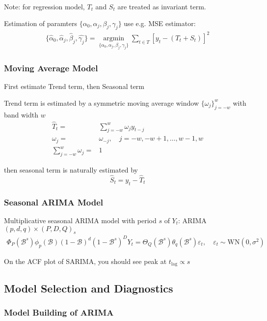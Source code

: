     Note: for regression model, $ T_t $ and $ S_t $ are treated as invariant term.

    Estimation of paramters $ \{\alpha _0,\alpha_j,\beta _j,\gamma _j\} $ use e.g. MSE estimator:
    \begin{align}
        \{\hat{\alpha }_0,\hat{\alpha }_j,\hat{\beta }_j,\hat{\gamma _j}\}=\mathop{\arg\min}\limits_{\{\alpha _0,\alpha_j,\beta _j,\gamma _j\}} \sum_{t\in T} \left[y_t-(T_t+S_t)\right]^2
    \end{align}


\subsubsection{Moving Average Model}
    First estimate Trend term, then Seasonal term

    Trend term is estimated by a symmetric moving average window $ \{\omega _j\}_{j=-w}^w $ with band width $ w $
    \begin{align}
        \hat{T}_t=&\sum_{j=-w}^w\omega _jy_{t-j}\\
        \omega _j=&\omega _{-j},\quad j=-w,-w+1,\ldots,w-1,w\\
        \sum_{j=-w}^w\omega _j=&1
    \end{align}
        
    then seasonal term is naturally estimated by 
    \[
        \hat{S}_t=y_t- \hat{T}_t
    \]
    
\subsubsection{Seasonal ARIMA Model}\label{SubSubSectionSARIMA}
    Multiplicative seasonal ARIMA model with period $ s $ of $ Y_t $: ARIMA$ (p,d,q)\times (P,D,Q)_s $
    \begin{align}
        \Phi _P(\mathscr{B} ^s)\phi _p(\mathscr{B} )(1-\mathscr{B} )^d(1-\mathscr{B} ^s)^DY_t=\Theta _Q(\mathscr{B} ^s)\theta _q(\mathscr{B} ^s)\varepsilon _t,\quad \varepsilon _t\sim \mathrm{WN}(0,\sigma ^2) 
    \end{align} 

    On the ACF plot of SARIMA, you should see peak at $ t_\mathrm{lag}\propto s  $
    
\subsection{Model Selection and Diagnostics}
\subsubsection{Model Building of ARIMA}

